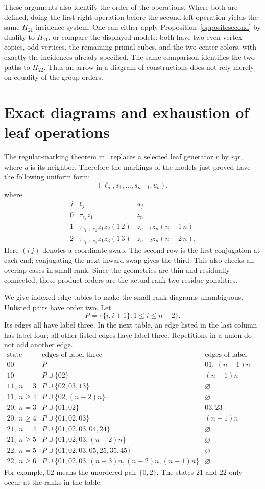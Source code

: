 \documentclass[11pt,a4paper]{article}
\begin{document}
These arguments also identify the order of the operations. Where
both are defined, doing the first right operation before the second
left operation yields the same $H_{21}$ incidence system. One can
either apply Proposition~\ref{oppositesecond} by duality to $H_{11}$,
or compare the displayed models: both have two even-vertex copies,
odd vertices, the remaining primal cubes, and the two center colors,
with exactly the incidences already specified. The same comparison
identifies the two paths to $H_{22}$. Thus an arrow in a diagram of
constructions does not rely merely on equality of the group orders.

\section{Exact diagrams and exhaustion of leaf operations}
The regular-marking theorem in~\cite{Coset} replaces a selected leaf
generator $r$ by $rqr$, where $q$ is its neighbor. Therefore the
markings of the models just proved have the following uniform form:
\[
 (\ell_a,s_1,\ldots,s_{n-1},u_b),
\]
where
\[
\begin{array}{c|c|c}
j&\ell_j&u_j\\\hline
0&\tau_{e_1}z_1&z_n\\
1&\tau_{e_1+e_2}z_1z_2(1\,2)&z_{n-1}z_n(n-1\,n)\\
2&\tau_{e_1+e_3}z_1z_3(1\,3)&z_{n-2}z_n(n-2\,n).
\end{array}
\]
Here $(i\,j)$ denotes a coordinate swap. The second row is the
first conjugation at each end; conjugating the next inward swap
gives the third. This also checks all overlap cases in small rank.
Since the geometries are thin and residually connected, these
product orders are the actual rank-two residue gonalities.

We give indexed edge tables to make the small-rank diagrams
unambiguous. Unlisted pairs have order two. Let
\[
 P=\{\{i,i+1\}:1\le i\le n-2\}.
\]
Its edges all have label three. In the next table, an edge listed
in the last column has label four; all other listed edges have
label three. Repetitions in a union do not add another edge.
\[
\begin{array}{c|l|l}
\text{state}&\text{edges of label three}&\text{edges of label four}\\\hline
00&P&01,\ (n-1)n\\
10&P\cup\{02\}&(n-1)n\\
11,\ n=3&P\cup\{02,03,13\}&\varnothing\\
11,\ n\ge4&P\cup\{02,(n-2)n\}&\varnothing\\
20,\ n=3&P\cup\{01,02\}&03,23\\
20,\ n\ge4&P\cup\{01,02,03\}&(n-1)n\\
21,\ n=4&P\cup\{01,02,03,04,24\}&\varnothing\\
21,\ n\ge5&P\cup\{01,02,03,(n-2)n\}&\varnothing\\
22,\ n=5&P\cup\{01,02,03,05,25,35,45\}&\varnothing\\
22,\ n\ge6&P\cup\{01,02,03,(n-3)n,(n-2)n,(n-1)n\}
 &\varnothing
\end{array}
\]
For example, $02$ means the unordered pair $\{0,2\}$.
The states $21$ and $22$ only occur at the ranks in the table.
\end{document}
